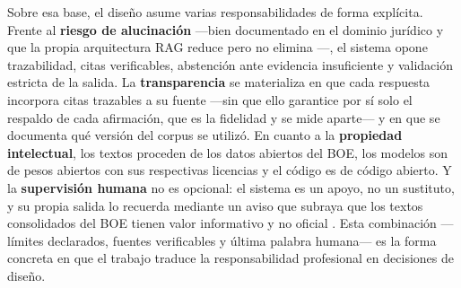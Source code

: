 Sobre esa base, el diseño asume varias responsabilidades de forma explícita. Frente al \textbf{riesgo de alucinación} —bien documentado en el dominio jurídico \cite{dahl2024legalhallucinations,magesh2025hallucinationfree} y que la propia arquitectura RAG reduce pero no elimina \cite{kim2025legalragfail}—, el sistema opone trazabilidad, citas verificables, abstención ante evidencia insuficiente y validación estricta de la salida. La \textbf{transparencia} se materializa en que cada respuesta incorpora citas trazables a su fuente —sin que ello garantice por sí solo el respaldo de cada afirmación, que es la fidelidad y se mide aparte— y en que se documenta qué versión del corpus se utilizó. En cuanto a la \textbf{propiedad intelectual}, los textos proceden de los datos abiertos del BOE, los modelos son de pesos abiertos con sus respectivas licencias y el código es de código abierto. Y la \textbf{supervisión humana} no es opcional: el sistema es un apoyo, no un sustituto, y su propia salida lo recuerda mediante un aviso que subraya que los textos consolidados del BOE tienen valor informativo y no oficial \cite{boeLegislacionActualizada}. Esta combinación —límites declarados, fuentes verificables y última palabra humana— es la forma concreta en que el trabajo traduce la responsabilidad profesional en decisiones de diseño.
